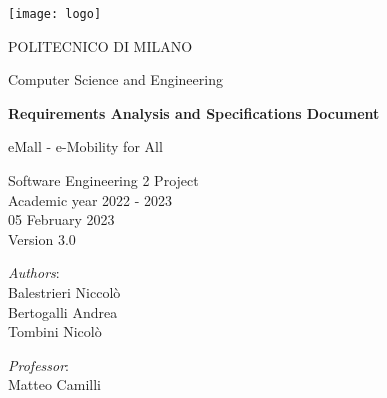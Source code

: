 \begin{titlingpage}
	\begin{center}
		\texttt{[image: logo]}
		
		\vspace{0.25cm}
		
		\LARGE POLITECNICO DI MILANO\\
		
		\vspace{0.2cm}
		
		\Large Computer Science and Engineering
		
		\vspace{0.8cm}
	
		\Huge \textbf{Requirements Analysis and Specifications Document}
		
		\vspace{0.5cm}
		\huge eMall - e-Mobility for All
		
		\vspace{1.5cm}
		\LARGE Software Engineering 2 Project\\
		\Large Academic year 2022 - 2023\\
		\vspace{1cm}
		05 February 2023\\Version 3.0
		\vspace{2.5cm}
		
		\large
		\begin{minipage}{.1\textwidth}
			\null
		\end{minipage}%
		\begin{minipage}{.4\textwidth}
			\textit{Authors}:\\
			Balestrieri Niccolò\\
			Bertogalli Andrea\\
			Tombini Nicolò
		\end{minipage}%
		\begin{minipage}{.4\textwidth}
			\raggedleft	
			\textit{Professor}:\\
			Matteo Camilli\\
			\phantom{placeholder}
		\end{minipage}%
		\begin{minipage}{.1\textwidth}
			\null
		\end{minipage}
	
			
		\end{center}
\end{titlingpage}